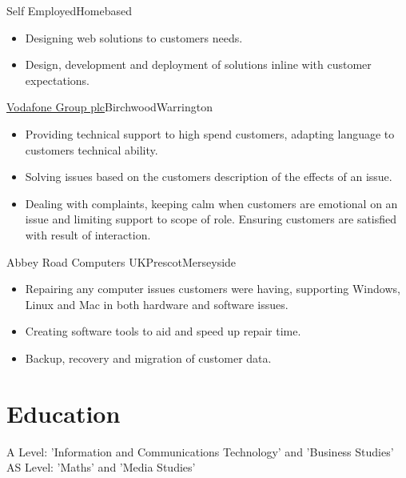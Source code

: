 \documentclass[a4paper,11pt]{moderncv}
\newcommand\weblink[2] {{\color{href} \href{#1}{#2}}}
\begin{document}
{Self Employed}{Homebased}{}{
\begin{itemize}
  \item Designing web solutions to customers needs.
  \item Design, development and deployment of solutions inline with customer expectations.
\end{itemize}
}

{\weblink{http://www.vodafone.com/}{Vodafone Group plc}}{Birchwood}{Warrington}{
\begin{itemize}
  \item Providing technical support to high spend customers, adapting language to customers technical ability.
  \item Solving issues based on the customers description of the effects of an issue.
  \item Dealing with complaints, keeping calm when customers are emotional on an issue and limiting support to scope of role. Ensuring customers are satisfied with result of interaction.
\end{itemize}
}

{Abbey Road Computers UK}{Prescot}{Merseyside}{
\begin{itemize}
  \item Repairing any computer issues customers were having, supporting Windows, Linux and Mac in both hardware and software issues.
  \item Creating software tools to aid and speed up repair time.
  \item Backup, recovery and migration of customer data.
\end{itemize}
}

\section{Education}
{
A Level: 'Information and Communications Technology' and 'Business Studies'\\
AS Level: 'Maths' and 'Media Studies'
}
\end{document}
